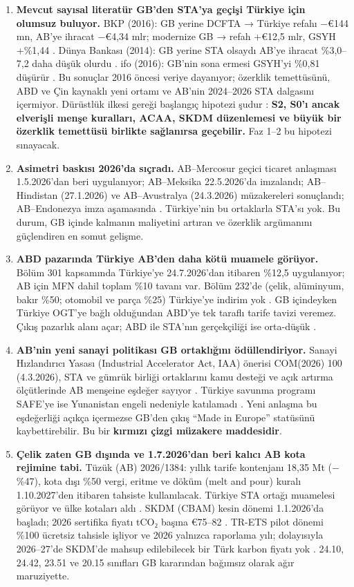 \begin{enumerate}
\item
  \textbf{Mevcut sayısal literatür GB'den STA'ya geçişi Türkiye için olumsuz buluyor.} BKP (2016): GB yerine DCFTA → Türkiye refahı −€144 mn, AB'ye ihracat −€4,34 mlr; modernize GB → refah +€12,5 mlr, GSYH +\%1,44 \etiketV{}. Dünya Bankası (2014): GB yerine STA olsaydı AB'ye ihracat \%3,0--7,2 daha düşük olurdu \etiketV{}. ifo (2016): GB'nin sona ermesi GSYH'yi \%0,81 düşürür \etiketV{}. Bu sonuçlar 2016 öncesi veriye dayanıyor; özerklik temettüsünü, ABD ve Çin kaynaklı yeni ortamı ve AB'nin 2024--2026 STA dalgasını içermiyor. Dürüstlük ilkesi gereği başlangıç hipotezi şudur \etiketH{}: \textbf{S2, S0'ı ancak elverişli menşe kuralları, ACAA, SKDM düzenlemesi ve büyük bir özerklik temettüsü birlikte sağlanırsa geçebilir.} Faz 1--2 bu hipotezi sınayacak.
\item
  \textbf{Asimetri baskısı 2026'da sıçradı.} AB--Mercosur geçici ticaret anlaşması 1.5.2026'dan beri uygulanıyor; AB--Meksika 22.5.2026'da imzalandı; AB--Hindistan (27.1.2026) ve AB--Avustralya (24.3.2026) müzakereleri sonuçlandı; AB--Endonezya imza aşamasında \etiketV{}. Türkiye'nin bu ortaklarla STA'sı yok. Bu durum, GB içinde kalmanın maliyetini artıran ve özerklik argümanını güçlendiren en somut gelişme.
\item
  \textbf{ABD pazarında Türkiye AB'den daha kötü muamele görüyor.} Bölüm 301 kapsamında Türkiye'ye 24.7.2026'dan itibaren \%12,5 uygulanıyor; AB için MFN dahil toplam \%10 tavanı var. Bölüm 232'de (çelik, alüminyum, bakır \%50; otomobil ve parça \%25) Türkiye'ye indirim yok \etiketV{}. GB içindeyken Türkiye OGT'ye bağlı olduğundan ABD'ye tek taraflı tarife tavizi veremez. Çıkış pazarlık alanı açar; ABD ile STA'nın gerçekçiliği ise orta-düşük \etiketH{}.
\item
  \textbf{AB'nin yeni sanayi politikası GB ortaklığını ödüllendiriyor.} Sanayi Hızlandırıcı Yasası (Industrial Accelerator Act, IAA) önerisi COM(2026) 100 (4.3.2026), STA ve gümrük birliği ortaklarını kamu desteği ve açık artırma ölçütlerinde AB menşeine eşdeğer sayıyor \etiketV{}. Türkiye savunma programı SAFE'ye ise Yunanistan engeli nedeniyle katılamadı \etiketV{}. Yeni anlaşma bu eşdeğerliği açıkça içermezse GB'den çıkış ``Made in Europe'' statüsünü kaybettirebilir. Bu bir \textbf{kırmızı çizgi müzakere maddesidir}.
\item
  \textbf{Çelik zaten GB dışında ve 1.7.2026'dan beri kalıcı AB kota rejimine tabi.} Tüzük (AB) 2026/1384: yıllık tarife kontenjanı 18,35 Mt (−\%47), kota dışı \%50 vergi, eritme ve döküm (melt and pour) kuralı 1.10.2027'den itibaren tahsiste kullanılacak. Türkiye STA ortağı muamelesi görüyor ve ülke kotaları aldı \etiketV{}. SKDM (CBAM) kesin dönemi 1.1.2026'da başladı; 2026 sertifika fiyatı tCO₂ başına €75--82 \etiketV{}. TR-ETS pilot dönemi \%100 ücretsiz tahsisle işliyor ve 2026 yalnızca raporlama yılı; dolayısıyla 2026--27'de SKDM'de mahsup edilebilecek bir Türk karbon fiyatı yok \etiketV{}. 24.10, 24.42, 23.51 ve 20.15 sınıfları GB kararından bağımsız olarak ağır maruziyette.

\end{enumerate}
